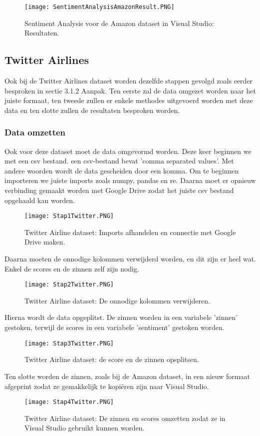 \begin{figure}[!htbp]
    \texttt{[image: SentimentAnalysisAmazonResult.PNG]}
    \caption{\label{azuresentimentanalysisamazonresults}Sentiment Analysis voor de Amazon dataset in Visual Studio: Resultaten.}
\end{figure}
\FloatBarrier 

\subsection{Twitter Airlines}
\label{twitterdatasetazure}

Ook bij de Twitter Airlines dataset worden dezelfde stappen gevolgd zoals eerder besproken in sectie 3.1.2 Aanpak. Ten eerste zal de data omgezet worden naar het juiste formaat, ten tweede zullen er enkele methodes uitgevoerd worden met deze data en ten slotte zullen de resultaten besproken worden. 

\subsubsection{Data omzetten}
\label{twitterdatasetomzettenazure}
Ook voor deze dataset moet de data omgevormd worden. Deze keer beginnen we met een csv bestand. een csv-bestand bevat 'comma separated values'. Met andere woorden wordt de data gescheiden door een komma. Om te beginnen importeren we juiste imports zoals numpy, pandas en re. Daarna moet er opnieuw verbinding gemaakt worden met Google Drive zodat het juiste csv bestand opgehaald kan worden. 
\begin{figure}[!htbp]
    \texttt{[image: Stap1Twitter.PNG]}
    \caption{\label{azurestap1twitter}Twitter Airline dataset: Imports afhandelen en connectie met Google Drive maken.}
\end{figure}
\FloatBarrier 

Daarna moeten de onnodige kolommen verwijderd worden, en dit zijn er heel wat. Enkel de scores en de zinnen zelf zijn nodig.
\begin{figure}[!htbp]
    \texttt{[image: Stap2Twitter.PNG]}
    \caption{\label{azurestap2twitter}Twitter Airline dataset: De onnodige kolommen verwijderen.}
\end{figure}
\FloatBarrier 

Hierna wordt de data opgeplitst. De zinnen worden in een variabele 'zinnen' gestoken, terwijl de scores in een variabele 'sentiment' gestoken worden. 
\begin{figure}[!htbp]
    \texttt{[image: Stap3Twitter.PNG]}
    \caption{\label{azurestap3twitter}Twitter Airline dataset: de score en de zinnen opsplitsen.}
\end{figure}
\FloatBarrier
Ten slotte worden de zinnen, zoals bij de Amazon dataset, in een nieuw formaat afgeprint zodat ze gemakkelijk te kopiëren zijn naar Visual Studio. 
\begin{figure}[!htbp]
    \texttt{[image: Stap4Twitter.PNG]}
    \caption{\label{azurestap4twitter}Twitter Airline dataset: De zinnen en scores omzetten zodat ze in Visual Studio gebruikt kunnen worden.}
\end{figure}
\FloatBarrier 

